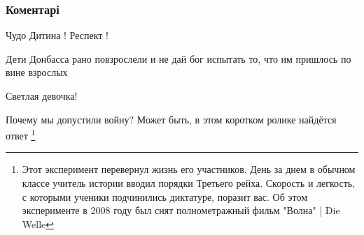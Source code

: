  
 
 
 
 
\subsubsection{Коментарі}

\begin{itemize}
 
Чудо Дитина ! Респект !

 
Дети Донбасса рано повзрослели и не дай бог испытать то, что им пришлось по вине взрослых

 
Светлая девочка!

 
Почему мы допустили войну? Может быть, в этом коротком ролике найдётся ответ
\footnote{ Этот эксперимент перевернул жизнь его участников. День за днем в
обычном классе учитель истории вводил порядки Третьего рейха. Скорость и
легкость, с которыми ученики подчинились диктатуре, поразит вас. Об этом
эксперименте в 2008 году был снят полнометражный фильм "Волна" | Die Welle
}


\end{itemize}
